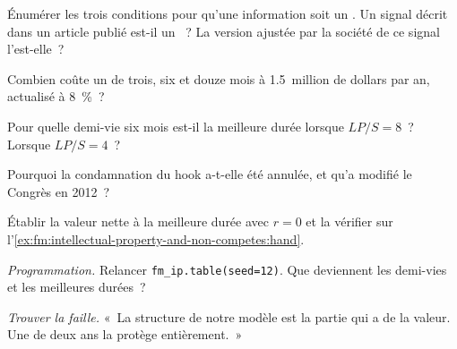 \begin{exercise}[$\star$]\label{exo:fm:intellectual-property-and-non-competes:2}
Énumérer les trois conditions pour qu'une information soit un . Un signal décrit dans un article publié est-il un ~? La version ajustée par la société
de ce signal l'est-elle~?
\end{exercise}

\begin{exercise}[$\star$]\label{exo:fm:intellectual-property-and-non-competes:3}
Combien coûte un  de trois, six et douze mois à 1.5~million de dollars par an, actualisé à 8~\%~?
\end{exercise}

\begin{exercise}[$\star\star$]\label{exo:fm:intellectual-property-and-non-competes:4}
Pour quelle demi-vie six mois est-il la meilleure durée lorsque $LP/S=8$~? Lorsque $LP/S=4$~?
\end{exercise}

\begin{exercise}[$\star\star$]\label{exo:fm:intellectual-property-and-non-competes:5}
Pourquoi la condamnation du hook a-t-elle été annulée, et qu'a modifié le Congrès en 2012~?
\end{exercise}

\begin{exercise}[$\star\star$]\label{exo:fm:intellectual-property-and-non-competes:6}
Établir la valeur nette à la meilleure durée avec $r=0$ et la vérifier sur l'\cref{ex:fm:intellectual-property-and-non-competes:hand}.
\end{exercise}

\begin{exercise}[$\star\star\star$]\label{exo:fm:intellectual-property-and-non-competes:7}
\emph{Programmation.} Relancer \texttt{fm\_ip.table(seed=12)}. Que deviennent les demi-vies et les meilleures durées~?
\end{exercise}

\begin{exercise}[$\star\star\star$]\label{exo:fm:intellectual-property-and-non-competes:8}
\emph{Trouver la faille.} «~La structure de notre modèle est la partie qui a de la valeur. Une  de deux ans la protège entièrement.~»
\end{exercise}

